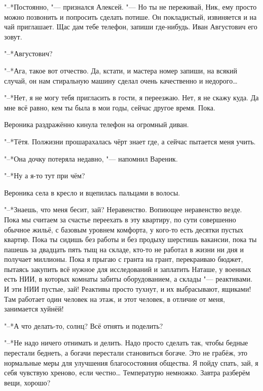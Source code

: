 "--*Постоянно, "--- признался Алексей.
"--- Но ты не переживай, Ник, ему просто можно позвонить и попросить сделать потише.
Он покладистый, извиняется и на чай приглашает.
Щас дам тебе телефон, запиши где-нибудь.
Иван Августович его зовут.

"--*Августович?

"--*Ага, такое вот отчество.
Да, кстати, и мастера номер запиши, на всякий случай, он нам стиральную машину сделал очень качественно и недорого\ldots{}

\asterism

\textspace

"--*Нет, я не могу тебя пригласить в гости, я переезжаю.
Нет, я не скажу куда.
Да мне всё равно, кем ты была в мои годы, сейчас другое время.
Пока.

Вероника раздражённо кинула телефон на огромный диван.

"--*Тётя.
Полжизни прошарахалась чёрт знает где, а сейчас пытается меня учить.

"--*Она дочку потеряла недавно, "--- напомнил Вареник.

"--*Ну а я-то тут при чём?

Вероника села в кресло и вцепилась пальцами в волосы.

"--*Знаешь, что меня бесит, зай?
Неравенство.
Вопиющее неравенство везде.
Пока мы считаем за счастье переехать в эту квартиру, по сути совершенно обычное жильё, с базовым уровнем комфорта, у кого-то есть десятки пустых квартир.
Пока ты сидишь без работы и без продыху шерстишь вакансии, пока ты пашешь за двадцать пять тыщ на складе, кто-то не работал в жизни ни дня и получает миллионы.
Пока я прыгаю с гранта на грант, перекраиваю бюджет, пытаясь закупить всё нужное для исследований и заплатить Наташе, у военных есть НИИ, в которых комнаты забиты оборудованием, а склады "--- реактивами.
И эти НИИ пустые, зай!
Реактивы просто тухнут, и их выбрасывают, ящиками!
Там работает один человек на этаж, и этот человек, в отличие от меня, занимается хуйнёй!

"--*А что делать-то, солнц?
Всё отнять и поделить?

"--*Не надо ничего отнимать и делить.
Надо просто сделать так, чтобы бедные перестали беднеть, а богачи перестали становиться богаче.
Это не грабёж, это нормальные меры для улучшения благосостояния общества.
Я пойду спать, зай, я себя чувствую хреново, если честно\ldots{}
Температурю немножко.
Завтра разберём вещи, хорошо?

\asterism

